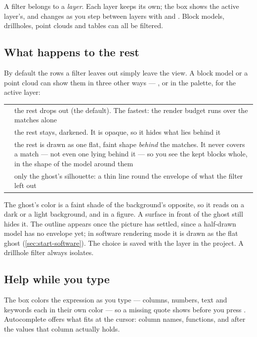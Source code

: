A filter belongs to a \emph{layer}. Each layer keeps its own; the box shows the active layer's, and changes as you step between layers with \key{[} and \key{]}. Block models, drillholes, point clouds and tables can all be filtered.

\subsection{What happens to the rest}\label{sec:filter-ghost}
By default the rows a filter leaves out simply leave the view. A block model or a point cloud can show them in three other ways — , or  in the palette, for the active layer:

\begin{center}
\begin{tabularx}{\linewidth}{@{}lL@{}}\toprule
{} & the rest drops out (the default). The fastest: the render budget runs over the matches alone \\
 & the rest stays, darkened. It is opaque, so it hides what lies behind it \\
 & the rest is drawn as one flat, faint shape \emph{behind} the matches. It never covers a match — not even one lying behind it — so you see the kept blocks whole, in the shape of the model around them \\
 & only the ghost's silhouette: a thin line round the envelope of what the filter left out \\ \bottomrule
\end{tabularx}
\end{center}

The ghost's color is a faint shade of the background's opposite, so it reads on a dark or a light background, and in a figure. A surface in front of the ghost still hides it. The outline appears once the picture has settled, since a half-drawn model has no envelope yet; in software rendering mode it is drawn as the flat ghost (\cref{sec:start-software}). The choice is saved with the layer in the project. A drillhole filter always isolates.

\subsection{Help while you type}
The box colors the expression as you type — columns, numbers, text and keywords each in their own color — so a missing quote shows before you press . Autocomplete offers what fits at the cursor: column names, functions, and after  the values that column actually holds.

